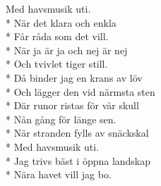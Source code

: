 \begin{SongText}
\begin{SongVerse}
Med havsmusik uti.\\*%
När det klara och enkla\\*%
Får råda som det vill.\\*%
När ja är ja och nej är nej\\*%
Och tvivlet tiger still.\\*%
Då binder jag en krans av löv\\*%
Och lägger den vid närmsta sten\\*%
Där runor ristas för vår skull\\*%
Nån gång för länge sen.\\*%
När stranden fylls av snäckskal\\*%
Med havsmusik uti.\\*%
Jag trivs bäst i öppna landskap\\*%
Nära havet vill jag bo. 
\end{SongVerse}
\end{SongText}
\newpage